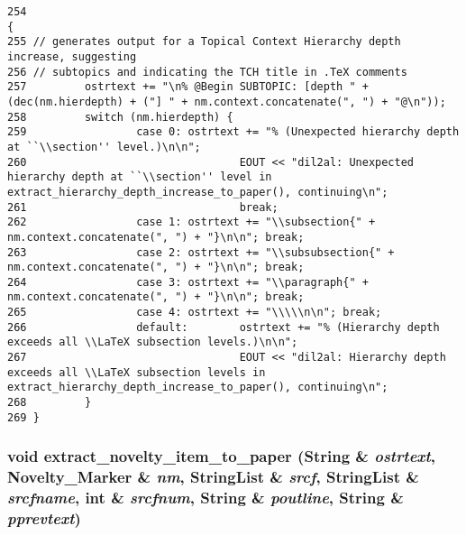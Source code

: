 \footnotesize\begin{verbatim}254                                                                                        {
255 // generates output for a Topical Context Hierarchy depth increase, suggesting
256 // subtopics and indicating the TCH title in .TeX comments
257         ostrtext += "\n% @Begin SUBTOPIC: [depth " + (dec(nm.hierdepth) + ("] " + nm.context.concatenate(", ") + "@\n"));
258         switch (nm.hierdepth) {
259                 case 0: ostrtext += "% (Unexpected hierarchy depth at ``\\section'' level.)\n\n";
260                                 EOUT << "dil2al: Unexpected hierarchy depth at ``\\section'' level in extract_hierarchy_depth_increase_to_paper(), continuing\n";
261                                 break;
262                 case 1: ostrtext += "\\subsection{" + nm.context.concatenate(", ") + "}\n\n"; break;
263                 case 2: ostrtext += "\\subsubsection{" + nm.context.concatenate(", ") + "}\n\n"; break;
264                 case 3: ostrtext += "\\paragraph{" + nm.context.concatenate(", ") + "}\n\n"; break;
265                 case 4: ostrtext += "\\\\\n\n"; break;
266                 default:        ostrtext += "% (Hierarchy depth exceeds all \\LaTeX subsection levels.)\n\n";
267                                 EOUT << "dil2al: Hierarchy depth exceeds all \\LaTeX subsection levels in extract_hierarchy_depth_increase_to_paper(), continuing\n";
268         }
269 }
\end{verbatim}\normalsize 
{}
\subsubsection{\setlength{\rightskip}{0pt plus 5cm}void extract\_\-novelty\_\-item\_\-to\_\-paper ({\bf String} \& {\em ostrtext}, {\bf Novelty\_\-Marker} \& {\em nm}, {\bf String\-List} \& {\em srcf}, {\bf String\-List} \& {\em srcfname}, int \& {\em srcfnum}, {\bf String} \& {\em poutline}, {\bf String} \& {\em pprevtext})}\label{ppfilter_8pre-blank_8cc_a13}




